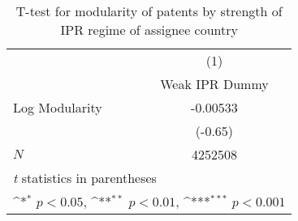 \begin{table}[htbp]\centering
\def\sym#1{\ifmmode^{#1}\else\(^{#1}\)\fi}
\caption{T-test for modularity of patents by strength of IPR regime of assignee country\label{a2}}
\begin{tabular}{l*{1}{c}}
\hline\hline
            &\multicolumn{1}{c}{(1)}\\
            &\multicolumn{1}{c}{Weak IPR Dummy}\\
\hline
Log Modularity        &    -0.00533         \\
            &     (-0.65)         \\
\hline
\(N\)       &     4252508         \\
\hline\hline
\multicolumn{2}{l}{\footnotesize \textit{t} statistics in parentheses}\\
\multicolumn{2}{l}{\footnotesize \sym{*} \(p<0.05\), \sym{**} \(p<0.01\), \sym{***} \(p<0.001\)}\\
\end{tabular}
\end{table}
